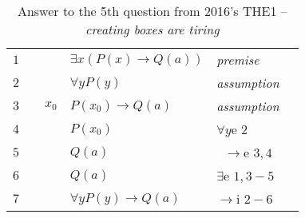 \documentclass[12pt]{article}                       %
\begin{document}
\begin{table}[H]
	\centering
    \caption{Answer to the 5th question from 2016's THE1 -- \textit{creating boxes are tiring}}
	\begin{tabular}{*6{l}}
		$1$ & & & $\exists x (P(x) \rightarrow Q(a))$ & \textit{premise} & \\ \cline{2-6}
		
		$2$ &\multicolumn{1}{|c}{} & & $\forall y P(y)$ &\textit{assumption} &\multicolumn{1}{c|}{}\\ \cline{3-5}
		 
		$3$ &\multicolumn{1}{|c}{}&\multicolumn{1}{|c}{$x_0$}& $P(x_0) \rightarrow Q(a)$ &\multicolumn{1}{l|}{\textit{assumption}}&\multicolumn{1}{c|}{}\\ 
		
		$4$ &\multicolumn{1}{|c}{}&\multicolumn{1}{|c}{}& $P(x_0)$ &\multicolumn{1}{l|}{$\forall y$e $2$}&\multicolumn{1}{c|}{}\\
		
		$5$ &\multicolumn{1}{|c}{}&\multicolumn{1}{|c}{}& $Q(a)$ & \multicolumn{1}{c|}{$\rightarrow$e $3,4$} &\multicolumn{1}{c|}{}\\ \cline{3-5}
		
		$6$ &\multicolumn{1}{|c}{}& & $Q(a)$ & $\exists$e $1,3-5$ & \multicolumn{1}{c|}{}\\ \cline{2-6}
		
		$7$ & & & $\forall y P(y) \rightarrow Q(a)$ & $\rightarrow$i $2-6$ & \\
	
	\end{tabular}
\end{table}
\end{document}
